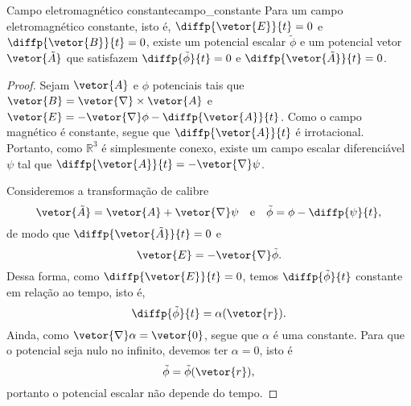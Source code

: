 \begin{lemma}{Campo eletromagnético constante}{campo_constante}
    Para um campo eletromagnético constante, isto é, \(\diffp{\vetor{E}}{t} = 0\) e \(\diffp{\vetor{B}}{t} = 0\), existe um potencial escalar \(\tilde{\phi}\) e um potencial vetor \(\vetor{\tilde{A}}\) que satisfazem \(\diffp{\tilde{\phi}}{t} = 0\) e \(\diffp{\vetor{\tilde{A}}}{t} = 0\).
\end{lemma}
\begin{proof}
    Sejam \(\vetor{A}\) e \(\phi\) potenciais tais que \(\vetor{B} = \vetor{\nabla}\times\vetor{A}\) e \(\vetor{E} = -\vetor{\nabla}\phi - \diffp{\vetor{A}}{t}\). Como o campo magnético é constante, segue que \(\diffp{\vetor{A}}{t}\) é irrotacional. Portanto, como \(\mathbb{R}^3\) é simplesmente conexo, existe um campo escalar diferenciável \(\psi\) tal que \(\diffp{\vetor{A}}{t} = -\vetor{\nabla}\psi\).

    Consideremos a transformação de calibre
    \begin{equation*}
        \vetor{\tilde{A}} = \vetor{A} + \vetor{\nabla}\psi\quad\text{e}\quad\tilde{\phi} = \phi -\diffp{\psi}{t},
    \end{equation*}
    de modo que \(\diffp{\vetor{\tilde{A}}}{t} = 0\) e
    \begin{equation*}
        \vetor{E} = -\vetor{\nabla}\tilde{\phi}.
    \end{equation*}
    Dessa forma, como \(\diffp{\vetor{E}}{t} = 0\), temos \(\diffp{\tilde{\phi}}{t}\) constante em relação ao tempo, isto é,
    \begin{equation*}
        \diffp{\tilde{\phi}}{t} = \alpha(\vetor{r}).
    \end{equation*}
    Ainda, como \(\vetor{\nabla}\alpha = \vetor{0}\), segue que \(\alpha\) é uma constante. Para que o potencial seja nulo no infinito, devemos ter \(\alpha = 0\), isto é
    \begin{equation*}
        \tilde{\phi} = \tilde{\phi}(\vetor{r}),
    \end{equation*}
    portanto o potencial escalar não depende do tempo.
\end{proof}

